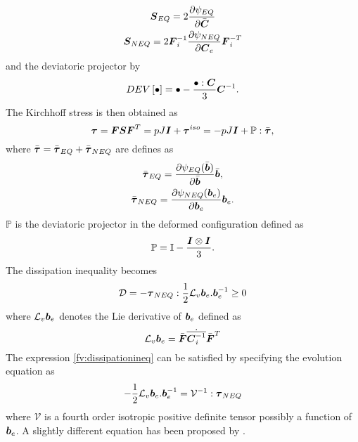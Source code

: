 \documentclass[11pt,twoside,TimesRoman]{article}
\newcommand{\parder}[2]{{\dfrac{\partial #1}{\partial #2}}}
\begin{document}
\begin{gather}
\bfS_{EQ} = 2\parder{\psi_{EQ}}{\bfCbar} \\
\bfS_{NEQ} = 2 \bfF_i^{-1} \parder{\psi_{NEQ}}{\bfC_e}\bfF_i^{-T}
\end{gather}
and the deviatoric projector by
\begin{equation}
DEV\left[ \bullet\right] = \bullet - \frac{\bullet:\mbox{\boldmath $C$}}{3} \mbox{\boldmath $C$}^{-1}.
\end{equation}
The Kirchhoff stress is then obtained as
\begin{equation}
	\boldsymbol{\tau} = \mbox{\boldmath $F$} \mbox{\boldmath $S$} \mbox{\boldmath $F$}^T = pJ\mbox{\boldmath $I$} + {\mbox{\boldmath $\tau$}}^{iso} = -pJ\mbox{\boldmath $I$} + \mathbb{P}:\bar{\mbox{\boldmath $\tau$}},
\end{equation}
where $\bar{\mbox{\boldmath $\tau$}} = \bar{\mbox{\boldmath $\tau$}}_{EQ} + \bar{\mbox{\boldmath $\tau$}}_{NEQ}$ are defines as 
\begin{gather}
	\bar{\bftau}_{EQ} = \parder{\psi_{EQ}(\bar{\bfb})}{\bar{\bfb}}\bar{\bfb}, \\
	\bar{\bftau}_{NEQ} = \parder{\psi_{NEQ}({\bfb}_e)}{{\bfb}_e}{{\bfb}_e}.
\end{gather}
$\mathbb{P}$ is the deviatoric projector in the deformed configuration defined as 
\begin{equation}
\mathbb{P} = \mathbb{I} - \frac{\mbox{\boldmath $I$} \otimes \mbox{\boldmath $I$}}{3}.
\end{equation}
The dissipation inequality becomes 
\begin{equation}
\mathcal{D} = -\boldsymbol{\tau}_{NEQ}:\frac{1}{2} \mathcal{L}_v\mbox{\boldmath $b$}_e. \mbox{\boldmath $b$}_e^{-1} \geq 0
\label{fv:dissipationineq}
\end{equation}
where $\mathcal{L}_v\mbox{\boldmath $b$}_e$ denotes the Lie derivative of $\mbox{\boldmath $b$}_e$ defined as 
\begin{equation}
\mathcal{L}_v\mbox{\boldmath $b$}_e = \bar{\mbox{\boldmath $F$}} \dot{\overline{ \mbox{\boldmath $C$}_i^{-1}}} \bar{\mbox{\boldmath $F$}}^T
\end{equation}
The expression \ref{fv:dissipationineq} can be satisfied by specifying the evolution equation as
\begin{equation}
-\frac{1}{2} \mathcal{L}_v\mbox{\boldmath $b$}_e. \mbox{\boldmath $b$}_e^{-1}  = \mathcal{V}^{-1} : \boldsymbol{\tau}_{NEQ}
\label{fv:evolution}
\end{equation}
where $\mathcal{V}$ is a fourth order isotropic positive definite tensor possibly a function of $\mbox{\boldmath $b$}_e$. A slightly different equation has been proposed by \cite{Bergstrom1998}.
\end{document}
